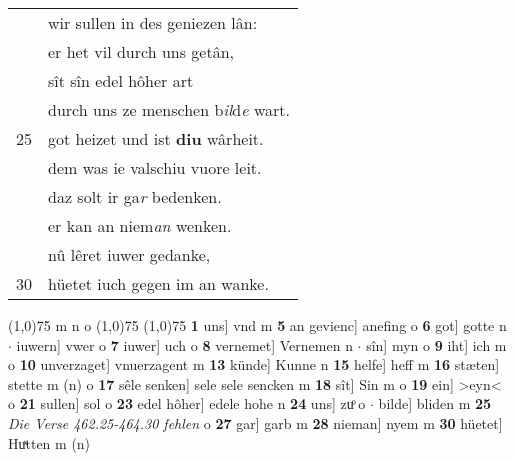 \documentclass[8pt,a4paper,notitlepage]{article}
\begin{document}
\begin{table}[ht]
\begin{minipage}[t]{0.5\linewidth}
\begin{tabular}{rl}
 & wir sullen in des geniezen lân:\\ 
 & er het vil durch uns getân,\\ 
 & sît sîn edel hôher art\\ 
 & durch uns ze menschen b\textit{il}d\textit{e} wart.\\ 
25 & got heizet und ist \textbf{diu} wârheit.\\ 
 & dem was ie valschiu vuore leit.\\ 
 & daz solt ir ga\textit{r} bedenken.\\ 
 & er kan an niem\textit{an} wenken.\\ 
 & nû lêret iuwer gedanke,\\ 
30 & hüetet iuch gegen im an wanke.\\ 
\end{tabular}
\scriptsize
\line(1,0){75} \newline
m n o \newline
\line(1,0){75} \newline
\newline
\line(1,0){75} \newline
\textbf{1} uns] vnd m \textbf{5} an gevienc] anefing o \textbf{6} got] gotte n  $\cdot$ iuwern] vwer o \textbf{7} iuwer] uch o \textbf{8} vernemet] Vernemen n  $\cdot$ sîn] myn o \textbf{9} iht] ich m o \textbf{10} unverzaget] vnuerzagent m \textbf{13} künde] Kunne n \textbf{15} helfe] heff m \textbf{16} stæten] stette m (n) o \textbf{17} sêle senken] sele sele sencken m \textbf{18} sît] Sin m o \textbf{19} ein] >eyn< o \textbf{21} sullen] sol o \textbf{23} edel hôher] edele hohe n \textbf{24} uns] zuͦ o  $\cdot$ bilde] bliden m \textbf{25} \textit{Die Verse 462.25-464.30 fehlen} o  \textbf{27} gar] garb m \textbf{28} nieman] nyem m \textbf{30} hüetet] Huͯtten m (n) \newline
\end{minipage}
\end{table}
\newpage
\end{document}
